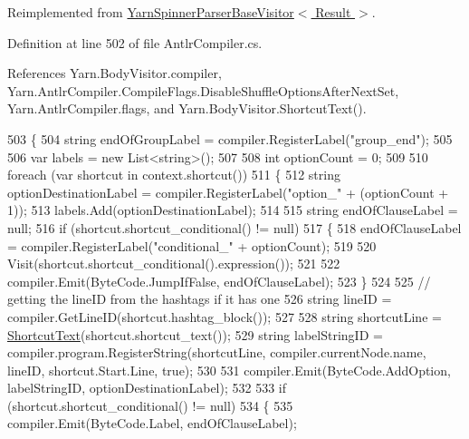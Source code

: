 Reimplemented from \hyperlink{a00187_a8299d25bc796f9c126635cf72aa3ea12}{Yarn\-Spinner\-Parser\-Base\-Visitor$<$ Result $>$}.



Definition at line 502 of file Antlr\-Compiler.\-cs.



References Yarn.\-Body\-Visitor.\-compiler, Yarn.\-Antlr\-Compiler.\-Compile\-Flags.\-Disable\-Shuffle\-Options\-After\-Next\-Set, Yarn.\-Antlr\-Compiler.\-flags, and Yarn.\-Body\-Visitor.\-Shortcut\-Text().


\begin{DoxyCode}
503         \{
504             \textcolor{keywordtype}{string} endOfGroupLabel = compiler.RegisterLabel(\textcolor{stringliteral}{"group\_end"});
505 
506             var labels = \textcolor{keyword}{new} List<string>();
507 
508             \textcolor{keywordtype}{int} optionCount = 0;
509 
510             \textcolor{keywordflow}{foreach} (var shortcut \textcolor{keywordflow}{in} context.shortcut())
511             \{
512                 \textcolor{keywordtype}{string} optionDestinationLabel = compiler.RegisterLabel(\textcolor{stringliteral}{"option\_"} + (optionCount + 1));
513                 labels.Add(optionDestinationLabel);
514 
515                 \textcolor{keywordtype}{string} endOfClauseLabel = null;
516                 \textcolor{keywordflow}{if} (shortcut.shortcut\_conditional() != null)
517                 \{
518                     endOfClauseLabel = compiler.RegisterLabel(\textcolor{stringliteral}{"conditional\_"} + optionCount);
519 
520                     Visit(shortcut.shortcut\_conditional().expression());
521 
522                     compiler.Emit(ByteCode.JumpIfFalse, endOfClauseLabel);
523                 \}
524 
525                 \textcolor{comment}{// getting the lineID from the hashtags if it has one}
526                 \textcolor{keywordtype}{string} lineID = compiler.GetLineID(shortcut.hashtag\_block());
527 
528                 \textcolor{keywordtype}{string} shortcutLine = \hyperlink{a00034_ad8448dacbbd94adebf38c29c3f50e499}{ShortcutText}(shortcut.shortcut\_text());
529                 \textcolor{keywordtype}{string} labelStringID = compiler.program.RegisterString(shortcutLine, 
      compiler.currentNode.name, lineID, shortcut.Start.Line, \textcolor{keyword}{true});
530 
531                 compiler.Emit(ByteCode.AddOption, labelStringID, optionDestinationLabel);
532 
533                 \textcolor{keywordflow}{if} (shortcut.shortcut\_conditional() != null)
534                 \{
535                     compiler.Emit(ByteCode.Label, endOfClauseLabel);

\end{DoxyCode}

